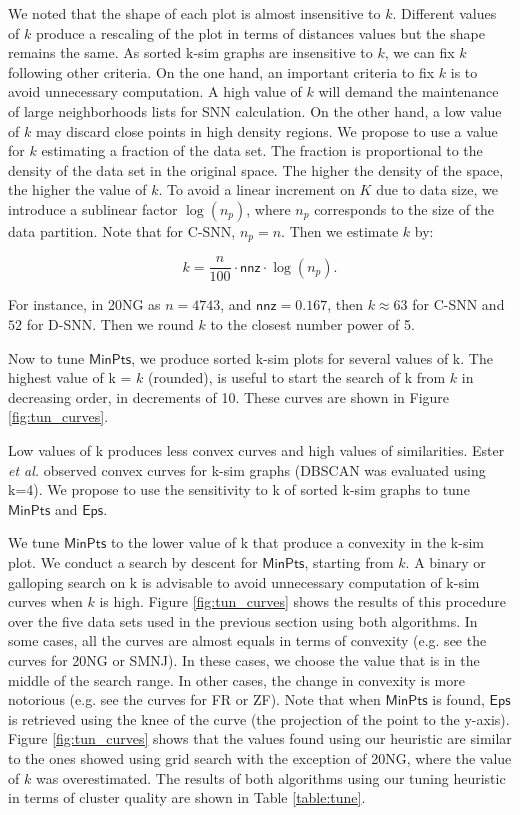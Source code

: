 \documentclass[preprint,12pt,authoryear,review]{elsarticle}
\begin{document}
We noted that the shape of each plot is almost insensitive to $k$. Different values of $k$ produce a rescaling of the plot in terms of distances values but the shape remains the same.  
As sorted k-sim graphs are insensitive to $k$, we can fix $k$ following other criteria. On the one hand, an important criteria to fix $k$ is to avoid unnecessary computation. A high value of $k$ will demand the maintenance of large neighborhoods lists for SNN calculation. On the other hand, a low value of $k$ may discard close points in high density regions. We propose to use a value for $k$ estimating a fraction of the data set. The fraction is proportional to the density of the data set in the original space. The higher the density of the space, the higher the value of $k$. To avoid a linear increment on $K$ due to data size, we introduce a sublinear factor $\log(n_p)$, where $n_p$ corresponds to the size of the data partition. Note that for C-SNN, $n_p = n$. Then we estimate $k$ by:

\[ k = \frac{n}{100} \cdot \textsf{nnz} \cdot \log(n_p) . \]

For instance, in 20NG as $n=4743$, and $\mathsf{nnz} = 0.167$, then $k \approx 63$ for C-SNN and $52$ for D-SNN. Then we round $k$ to the closest number power of 5. 

Now to tune $\mathsf{MinPts}$, we produce sorted k-sim plots for several values of k. 
The highest value of k = $k$ (rounded), is useful to start the search of k from $k$ in decreasing order, in decrements of 10. These curves are shown in Figure \ref{fig:tun_curves}.

Low values of k produces less convex curves and high values of similarities. 
Ester \textit{et al.} \cite{E96} observed convex curves for k-sim graphs (DBSCAN was evaluated using k=4). 
We propose to use the sensitivity to k of sorted k-sim graphs to tune $\mathsf{MinPts}$ and $\mathsf{Eps}$. 

We tune $\mathsf{MinPts}$ to the lower value of k that produce a convexity in the k-sim plot. We conduct a search by descent for $\mathsf{MinPts}$, starting from $k$. A binary or galloping search on k is advisable to avoid unnecessary computation of k-sim curves when $k$ is high. Figure \ref{fig:tun_curves} shows the results of this procedure over the five data sets used in the previous section using both algorithms. In some cases, all the curves are almost equals in terms of convexity (e.g. see the curves for 20NG or SMNJ). In these cases, we choose the value that is in the middle of the search range. In other cases, the change in convexity is more notorious (e.g. see the curves for FR or ZF). Note that when $\mathsf{MinPts}$ is found, $\mathsf{Eps}$ is retrieved using the knee of the curve (the projection of the point to the y-axis). Figure \ref{fig:tun_curves} shows that the values found using our heuristic are similar to the ones showed using grid search with the exception of 20NG, where the value of $k$ was overestimated. The results of both algorithms using our tuning heuristic in terms of cluster quality are shown in Table \ref{table:tune}.
\end{document}
